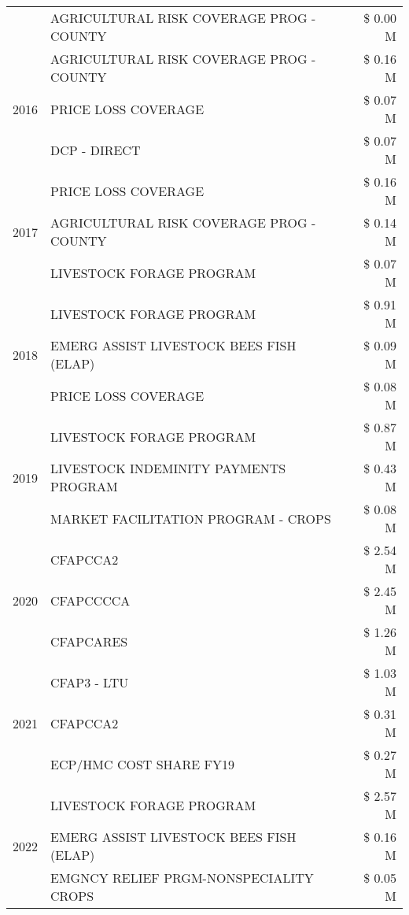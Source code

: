 \begin{tabular}{llr}
 & AGRICULTURAL RISK COVERAGE PROG - COUNTY & \$ 0.00 M \\
\cline{1-3}
\multirow[t]{3}{*}{2016} & AGRICULTURAL RISK COVERAGE PROG - COUNTY & \$ 0.16 M \\
 & PRICE LOSS COVERAGE & \$ 0.07 M \\
 & DCP - DIRECT & \$ 0.07 M \\
\cline{1-3}
\multirow[t]{3}{*}{2017} & PRICE LOSS COVERAGE & \$ 0.16 M \\
 & AGRICULTURAL RISK COVERAGE PROG - COUNTY & \$ 0.14 M \\
 & LIVESTOCK FORAGE PROGRAM & \$ 0.07 M \\
\cline{1-3}
\multirow[t]{3}{*}{2018} & LIVESTOCK FORAGE PROGRAM & \$ 0.91 M \\
 & EMERG ASSIST LIVESTOCK BEES FISH (ELAP) & \$ 0.09 M \\
 & PRICE LOSS COVERAGE & \$ 0.08 M \\
\cline{1-3}
\multirow[t]{3}{*}{2019} & LIVESTOCK FORAGE PROGRAM & \$ 0.87 M \\
 & LIVESTOCK INDEMINITY PAYMENTS PROGRAM & \$ 0.43 M \\
 & MARKET FACILITATION PROGRAM - CROPS & \$ 0.08 M \\
\cline{1-3}
\multirow[t]{3}{*}{2020} & CFAPCCA2 & \$ 2.54 M \\
 & CFAPCCCCA & \$ 2.45 M \\
 & CFAPCARES & \$ 1.26 M \\
\cline{1-3}
\multirow[t]{3}{*}{2021} & CFAP3 - LTU & \$ 1.03 M \\
 & CFAPCCA2 & \$ 0.31 M \\
 & ECP/HMC COST SHARE FY19 & \$ 0.27 M \\
\cline{1-3}
\multirow[t]{3}{*}{2022} & LIVESTOCK FORAGE PROGRAM & \$ 2.57 M \\
 & EMERG ASSIST LIVESTOCK BEES FISH (ELAP) & \$ 0.16 M \\
 & EMGNCY RELIEF PRGM-NONSPECIALITY CROPS & \$ 0.05 M \\
\cline{1-3}
\bottomrule
\end{tabular}
